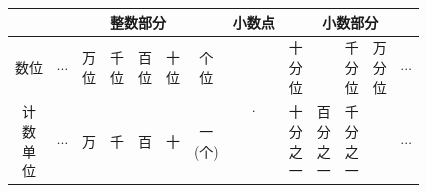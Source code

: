 \documentclass{article}
\begin{document}
\begin{table}[htbp]
    \centering
    \renewcommand{\arraystretch}{1.5} %
    \begin{tabular}{|c|c|c|c|c|c|c|c|c|c|c|c|c|}
        \hline
        & \multicolumn{6}{c|}{整数部分} 
        & 小数点 
        & \multicolumn{5}{c|}{小数部分} \\
        \hline
        
        数位 
        & $\cdots$ 
        & \makecell{万\\位} 
        & \makecell{千\\位} 
        & \makecell{百\\位} 
        & \makecell{十\\位} 
        & \makecell{个\\位} 
        & \multirow{2}{*}{$\cdot$} %
        & \makecell{十\\分\\位} 
        & %
        & \makecell{千\\分\\位} 
        & \makecell{万\\分\\位} 
        & $\cdots$ \\
        \cline{1-7} \cline{9-13} %
        
        \makecell{计\\数\\单\\位} 
        & $\cdots$ 
        & 万 & 千 & 百 & 十 
        & \makecell{一\\(个)} 
        & %
        & \makecell{十\\分\\之\\一} 
        & \makecell{百\\分\\之\\一} 
        & \makecell{千\\分\\之\\一} 
        & %
        & $\cdots$ \\
        \hline
    \end{tabular}
\end{table}
\end{document}
